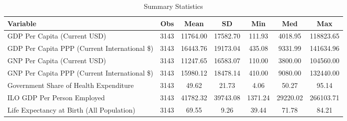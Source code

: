 \begin{table}
\centering
\caption{Summary Statistics}
\label{Sum_Stats}
\begin{tabular}{lcccccc}
\toprule
                                    Variable &  Obs &     Mean &       SD &     Min &      Med &       Max \\
\midrule
GDP Per Capita (Current USD) & 3143 & 11764.00 & 17582.70 & 111.93 & 4018.95 & 118823.65 \\
GDP Per Capita PPP (Current International \$) & 3143 & 16443.76 & 19173.04 & 435.08 & 9331.99 & 141634.96 \\
GNP Per Capita (Current USD) & 3143 & 11247.65 & 16583.07 & 110.00 & 3800.00 & 104560.00 \\
GNP Per Capita PPP (Current International \$) & 3143 & 15980.12 & 18478.14 & 410.00 & 9080.00 & 132440.00 \\
Government Share of Health Expenditure & 3143 & 49.62 & 21.73 & 4.06 & 50.27 & 95.14 \\
ILO GDP Per Person Employed & 3143 & 41782.32 & 39743.08 & 1371.24 & 29220.02 & 266103.71 \\
Life Expectancy at Birth (All Population) & 3143 & 69.55 & 9.26 & 39.44 & 71.78 & 84.21 \\
\bottomrule
\end{tabular}
\end{table}
